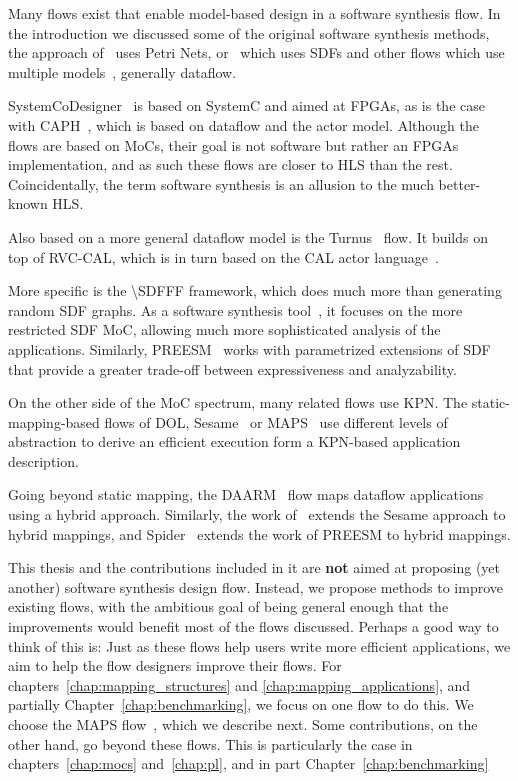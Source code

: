 Many flows exist that enable model-based design in a software synthesis flow.
In the introduction we discussed some of the original software synthesis methods,
the approach of~\cite{lin1998softwaresynthesis} uses Petri Nets, or~\cite{ritz1992softwaresynthesis} which uses \acp{SDF}
and other flows which use multiple models~\cite{bhartacharyya2000softwaresynthesis,pino1995softwaresynthesis,bhattacharyya2012softwaresynthesis}, generally dataflow.

SystemCoDesigner~\cite{haubelt2008systemcodesigner} is based on SystemC and aimed at \acsp{FPGA}, as is the case with CAPH~\cite{serot2013caph}, which is based on dataflow and the actor model.
Although the flows are based on \acp{MoC}, their goal is not software but rather an \acsp{FPGA} implementation, and as such these flows are closer to \ac{HLS} than the rest. 
Coincidentally, the term software synthesis is an allusion to the much better-known \ac{HLS}.

Also based on a more general dataflow model is the Turnus~\cite{casale2013turnus} flow.
It builds on top of RVC-CAL, which is in turn based on the CAL actor language~\cite{eker2003cal}.

More specific is the \ac{\SDFFF}\cite{sdf3} framework, which does much more than generating random \ac{SDF} graphs.
As a software synthesis tool~\cite{stuijk2010predictable}, it focuses on the more restricted \ac{SDF} \ac{MoC}, allowing much more sophisticated analysis of the applications.
Similarly, PREESM~\cite{pelcat2014preesm} works with parametrized extensions of \ac{SDF}~\cite{desnos2013pimm} that provide a greater trade-off between expressiveness and analyzability.

On the other side of the \ac{MoC} spectrum, many related flows use \ac{KPN}.
The static-mapping-based flows of \ac{DOL}\cite{thiele2007DOL}, Sesame~\cite{sesame} or \ac{MAPS}~\cite{maps} use different levels of abstraction to derive an efficient execution form a \ac{KPN}-based application description.

Going beyond static mapping, the DAARM~\cite{weichslgartner2014daarm} flow maps dataflow applications using a hybrid approach.
Similarly, the work of~\cite{quan2015hybrid} extends the Sesame approach to hybrid mappings, and Spider~\cite{heulot2014spider} extends the work of PREESM to hybrid mappings.

This thesis and the contributions included in it are \textbf{not} aimed at proposing (yet another) software synthesis design flow.
Instead, we propose methods to improve existing flows, with the ambitious goal of being general enough that the improvements would benefit most of the flows discussed. 
Perhaps a good way to think of this is: Just as these flows help users write more efficient applications, we aim to help the flow designers improve their flows.
For chapters~\ref{chap:mapping_structures} and \ref{chap:mapping_applications}, and partially Chapter~\ref{chap:benchmarking}, we focus on one flow to do this.
We choose the \ac{MAPS} flow~\cite{maps}, which we describe next.
Some contributions, on the other hand, go beyond these flows. This is particularly the case in chapters~\ref{chap:mocs} and~\ref{chap:pl}, and in part Chapter~\ref{chap:benchmarking} 

